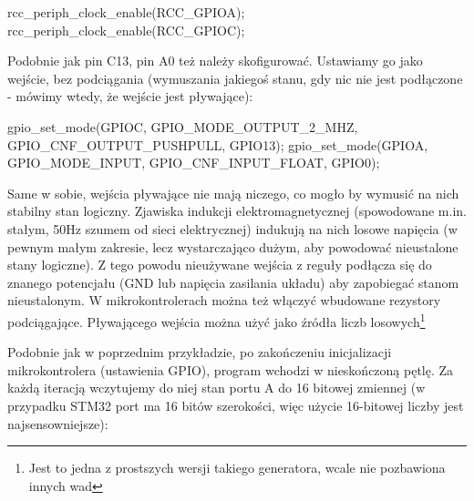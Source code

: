 \begin{CodeFrame*}[c]{}
  rcc_periph_clock_enable(RCC_GPIOA);
  rcc_periph_clock_enable(RCC_GPIOC);
\end{CodeFrame*}

Podobnie jak pin C13, pin A0 też należy skofigurować\footnotemark. Ustawiamy go jako wejście, bez podciągania
(wymuszania jakiegoś stanu, gdy nic nie jest podłączone - mówimy wtedy, że wejście jest pływające):

\begin{CodeFrame*}[c]{}
  gpio_set_mode(GPIOC, GPIO_MODE_OUTPUT_2_MHZ, GPIO_CNF_OUTPUT_PUSHPULL, GPIO13);
  gpio_set_mode(GPIOA, GPIO_MODE_INPUT, GPIO_CNF_INPUT_FLOAT, GPIO0);
\end{CodeFrame*}


Same w sobie, wejścia pływające nie mają niczego, co mogło by wymusić na nich stabilny stan logiczny. Zjawiska indukcji
elektromagnetycznej (spowodowane m.in. stałym, 50Hz szumem od sieci elektrycznej) indukują na nich losowe napięcia
(w pewnym małym zakresie, lecz wystarczająco dużym, aby powodować nieustalone stany logiczne). Z tego powodu
nieużywane wejścia z reguły podłącza się do znanego potencjału (GND lub napięcia zasilania układu) aby zapobiegać
stanom nieustalonym. W mikrokontrolerach można też włączyć wbudowane rezystory podciągające.
%
Pływającego wejścia można użyć jako źródła liczb losowych\footnote{Jest to jedna z prostszych wersji takiego
  generatora, wcale nie pozbawiona innych wad}

Podobnie jak w poprzednim przykładzie, po zakończeniu inicjalizacji mikrokontrolera (ustawienia GPIO), program
wchodzi w nieskończoną pętlę. Za każdą iteracją wczytujemy do niej stan portu A do 16 bitowej zmiennej
(w przypadku STM32 port ma 16 bitów szerokości, więc użycie 16-bitowej liczby jest najsensowniejsze):

\begin{CodeFrame*}[c]{}
  int16_t stan_a;

  while(1){
    stan_a = gpio_port_read(GPIOA);
\end{CodeFrame*}

